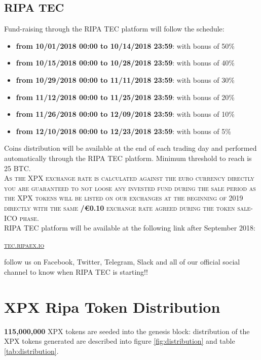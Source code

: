 \documentclass[11pt,fleqn,oneside]{book} %
\begin{document}
\subsection{RIPA TEC}
Fund-raising through the RIPA TEC platform will follow the schedule:
\begin{itemize}
	\item \textbf{from 10/01/2018 00:00 to 10/14/2018 23:59}: with bonus of 50\% 
	\item \textbf{from 10/15/2018 00:00 to 10/28/2018 23:59}: with bonus of 40\% 
	\item \textbf{from 10/29/2018 00:00 to 11/11/2018 23:59}: with bonus of 30\% 
	\item \textbf{from 11/12/2018 00:00 to 11/25/2018 23:59}: with bonus of 20\% 
	\item \textbf{from 11/26/2018 00:00 to 12/09/2018 23:59}: with bonus of 10\% 
	\item \textbf{from 12/10/2018 00:00 to 12/23/2018 23:59}: with bonus of 5\% 
\end{itemize}
\vspace{5mm}
Coins distribution will be available at the end of each trading day and performed automatically through the RIPA TEC platform. Minimum
threshold to reach is 25 BTC.\\

\textsc{As the XPX exchange rate is calculated against the euro currency directly you are guaranteed to not loose any invested fund
during the sale period as the XPX tokens will be listed on our exchanges at the beginning of 2019 directly with the same \textbf{\PHP/\euro0.10}
exchange rate agreed during the token sale-ICO phase}.\\

RIPA TEC platform will be available at the following link after September 2018:
\begin{center}
	\href{https://tex.ripaex.io}{\textsc{tec.ripaex.io}}
\end{center}
follow us on Facebook, Twitter, Telegram, Slack and all of our official social channel to know when RIPA TEC is starting!!

\section{XPX Ripa Token Distribution}
\textbf{115,000,000} XPX tokens are seeded into the genesis block: distribution of the XPX tokens generated are described into
figure \ref{fig:distribution} and table \ref{tab:distribution}.
\end{document}
